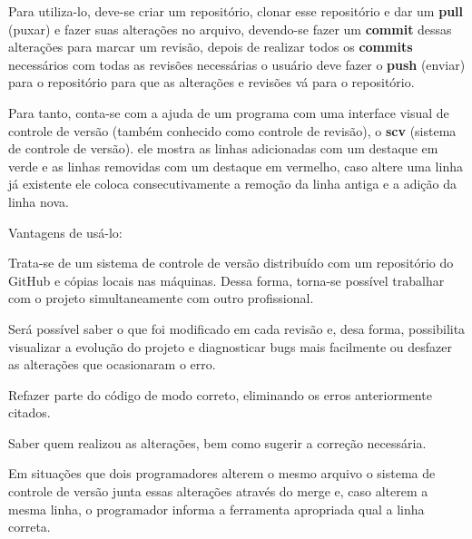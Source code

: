Para utiliza-lo, deve-se criar um repositório, clonar esse repositório e dar um \textbf{pull} (puxar) e fazer suas alterações no arquivo, devendo-se fazer um \textbf{commit} dessas alterações para marcar um revisão, depois de realizar todos os \textbf{commits} necessários com todas as revisões necessárias o usuário deve fazer o \textbf{push} (enviar) para o repositório para que as alterações e revisões vá para o repositório.\cite{githow} 

Para tanto, conta-se com a ajuda de um programa com uma interface visual de controle de versão (também conhecido como controle de revisão), o \textbf{scv} (sistema de controle de versão). ele mostra as linhas adicionadas com um destaque em verde e as linhas removidas com um destaque em vermelho, caso altere uma linha já existente ele coloca consecutivamente a remoção da linha antiga e a adição da linha nova. \cite{sourcetree}				

Vantagens de usá-lo: 
\begin{description}
	\setlength\itemindent{15pt}	
	\item[•] Trata-se de um sistema de controle de versão distribuído com um repositório do GitHub e cópias locais nas máquinas. Dessa forma, torna-se possível trabalhar com o projeto simultaneamente com outro profissional. 
	
	\item[•] Será possível saber o que foi modificado em cada revisão e, desa forma, possibilita visualizar a evolução do projeto e diagnosticar bugs mais facilmente ou desfazer as alterações que ocasionaram o erro. 
	
	\item[•] Refazer parte do código de modo correto, eliminando os erros anteriormente citados. 
	
	\item[•] Saber quem realizou as alterações, bem como sugerir a correção necessária. 
	
	\item[•] Em situações que dois programadores alterem o mesmo arquivo o sistema de controle de versão junta essas alterações através do merge e, caso alterem a mesma linha, o programador informa a ferramenta apropriada qual a linha correta. \cite{GitConflict}
	
\end{description}  	

